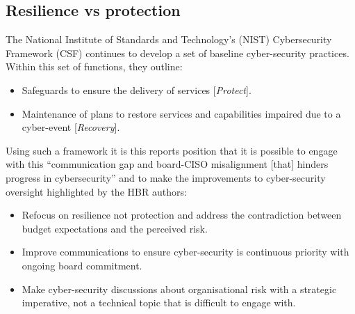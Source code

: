 \subsection{Resilience vs protection}

The National Institute of Standards and Technology's (NIST) Cybersecurity Framework (CSF) \autocite{NIST:2018} continues to develop a set of baseline
cyber-security practices.  Within this set of functions, they outline:

\begin{itemize}
\item Safeguards to ensure the delivery of services [\textit{Protect}].
\item Maintenance of plans to restore services and capabilities impaired due to a cyber-event [\textit{Recovery}].
\end{itemize}
  
Using such a framework it is this reports position that it is possible to engage with this
\enquote{communication gap and board-CISO misalignment [that] hinders progress in cybersecurity}
and to make the improvements to cyber-security oversight highlighted by the HBR authors:

\begin{itemize}
\item Refocus on resilience not protection and address the contradiction between budget expectations and the perceived risk. 
\item Improve communications to ensure cyber-security is continuous priority with ongoing board commitment.
\item Make cyber-security discussions about organisational risk with a strategic imperative, not a technical topic that is difficult to engage with. 
\end{itemize}





